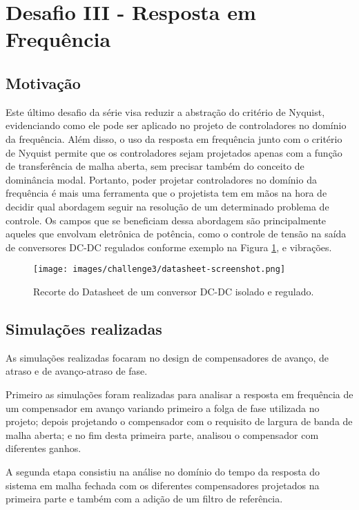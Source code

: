 \section{Desafio III - Resposta em Frequência}

\subsection{Motivação}
Este último desafio da série visa reduzir a abstração do critério de Nyquist,
evidenciando como ele pode ser aplicado no projeto de controladores no domínio
da frequência. Além disso, o uso da resposta em frequência junto com o critério
de Nyquist permite que os controladores sejam projetados apenas com a função de
transferência de malha aberta, sem precisar também do conceito de dominância
modal. Portanto, poder projetar controladores no domínio da frequência é mais
uma ferramenta que o projetista tem em mãos na hora de decidir qual abordagem
seguir na resolução de um determinado problema de controle. Os campos que se
beneficiam dessa abordagem são principalmente aqueles que envolvam eletrônica de
potência, como o controle de tensão na saída de conversores DC-DC regulados
conforme exemplo na Figura \ref{fig:desafio3:dc-dc-datasheet}, e vibrações.

\begin{figure}[h]
	\centering
	\caption{Recorte do Datasheet de um conversor DC-DC isolado e regulado.}
	\label{fig:desafio3:dc-dc-datasheet}
	\texttt{[image: images/challenge3/datasheet-screenshot.png]}
\end{figure}

\subsection{Simulações realizadas}
As simulações realizadas focaram no design de compensadores de avanço, de atraso
e de avanço-atraso de fase.

Primeiro as simulações foram realizadas para analisar a
resposta em frequência de um compensador em avanço variando primeiro a folga de
fase utilizada no projeto; depois projetando o compensador com o requisito de
largura de banda de malha aberta; e no fim desta primeira parte, analisou o
compensador com diferentes ganhos.

A segunda etapa consistiu na análise no
domínio do tempo da resposta do sistema em malha fechada com os diferentes
compensadores projetados na primeira parte e também com a adição de um filtro de
referência.

